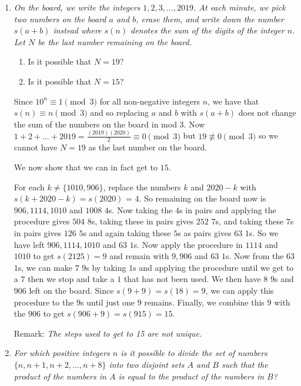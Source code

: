 \documentclass{article}
\begin{document}
\begin{enumerate}

\medskip
\item %
{\itshape On the board, we write the integers $1, 2, 3, \dots, 2019$.
At each minute, we pick two numbers on the board $a$ and $b$, erase them, and write down the number $s(a + b)$ instead where $s(n)$ denotes the sum of the digits of the integer $n$.
Let $N$ be the last number remaining on the board.
\begin{enumerate}
	\item Is it possible that $N = 19$?
	\item Is it possible that $N = 15$?
\end{enumerate}}

Since $10^{n} \equiv 1 \pmod 3$ for all non-negative integers $n$, we have that $s(n) \equiv n \pmod 3$ and so replacing $a$ and $b$ with $s(a+b)$ does not change the sum of the numbers on the board in mod 3. 
Now $1 + 2 +... + 2019 = \frac{(2019)(2020)}{2} \equiv 0 \pmod 3$ but $19 \not\equiv 0 \pmod 3$ so we cannot have $N=19$ as the last number on the board. 

We now show that we can in fact get to $15$. 

For each $k \neq \{1010, 906\}$, replace the numbers $k$ and $2020-k$ with $s(k + 2020-k) = s(2020)$ = $4$. So remaining on the board now is $906, 1114, 1010$ and $1008$ $4$s. Now taking the $4$s in pairs and applying the procedure gives $504$ $8$s, taking these in pairs gives $252$ $7$s, and taking these $7$s in pairs gives $126$ $5$s and again taking these $5$s as pairs gives $63$ $1$s. So we have left $906, 1114, 1010$ and $63$ $1$s. Now apply the procedure in $1114$ and $1010$ to get $s(2125)=9$ and remain with $9, 906$ and $63$ $1$s. Now from the $63$ $1$s, we can make $7$ $9$s by taking $1$s and applying the procedure until we get to a $7$ then we stop and take a $1$ that has not been used. We then have $8$ $9$s and $906$ left on the board. Since $s(9 + 9) = s(18) = 9$, we can apply this procedure to the $9$s until just one $9$ remains. Finally, we combine this $9$ with the $906$ to get $s(906 + 9) = s(915) = 15$.

Remark: {\itshape The steps used to get to 15 are not unique.}

\medskip
\item %
{\itshape For which positive integers $n$ is it possible to divide the set of numbers $\{n, n+1, n+2, \dotsc, n+8\}$ into two disjoint sets $A$ and $B$ such that the product of the numbers in $A$ is equal to the product of the numbers in $B$?}


\end{enumerate}
\end{document}
